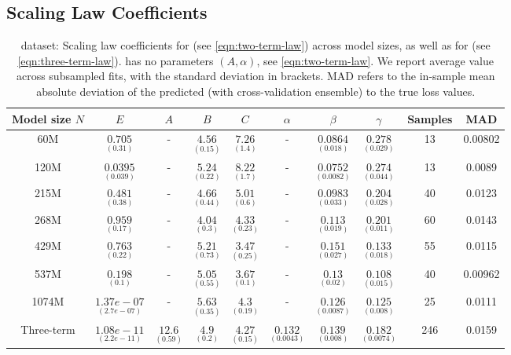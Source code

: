  


\subsection{Scaling Law Coefficients}\label{sec:app:coefficients}

\begin{table}[H]
\centering
\caption{\li{} dataset: Scaling law coefficients for \ttl{} (see \eqref{eqn:two-term-law}) across model sizes, as well as for \tttl{} (see \eqref{eqn:three-term-law}). \ttl{} has no parameters $(A, \alpha)$, see \eqref{eqn:two-term-law}. We report average value across subsampled fits, with the standard deviation in brackets. MAD refers to the in-sample mean absolute deviation of the predicted (with cross-validation ensemble) to the true loss values.}
\label{tab:bs-step-laws-li}
\begin{tabular}{|c|cccc|ccc||cc|}
\hline
Model size $N$ & $E$ & $A$ & $B$ & $C$ & $\alpha$ & $\beta$ & $\gamma$ & Samples & MAD \\
\hline \hline
60M & $\underset{(0.31)}{0.705}$ & - & $\underset{(0.15)}{4.56}$ & $\underset{(1.4)}{7.26}$ & - & $\underset{(0.018)}{0.0864}$ & $\underset{(0.029)}{0.278}$ & 13 & 0.00802 \\[10pt]
120M & $\underset{(0.039)}{0.0395}$ & - & $\underset{(0.22)}{5.24}$ & $\underset{(1.7)}{8.22}$ & - & $\underset{(0.0082)}{0.0752}$ & $\underset{(0.044)}{0.274}$ & 13 & 0.0089 \\[10pt]
215M & $\underset{(0.38)}{0.481}$ & - & $\underset{(0.44)}{4.66}$ & $\underset{(0.6)}{5.01}$ & - & $\underset{(0.033)}{0.0983}$ & $\underset{(0.028)}{0.204}$ & 40 & 0.0123 \\[10pt]
268M & $\underset{(0.17)}{0.959}$ & - & $\underset{(0.3)}{4.04}$ & $\underset{(0.23)}{4.33}$ & - & $\underset{(0.019)}{0.113}$ & $\underset{(0.011)}{0.201}$ & 60 & 0.0143 \\[10pt]
429M & $\underset{(0.22)}{0.763}$ & - & $\underset{(0.73)}{5.21}$ & $\underset{(0.25)}{3.47}$ & - & $\underset{(0.027)}{0.151}$ & $\underset{(0.018)}{0.133}$ & 55 & 0.0115 \\[10pt]
537M & $\underset{(0.1)}{0.198}$ & - & $\underset{(0.55)}{5.05}$ & $\underset{(0.1)}{3.67}$ & - & $\underset{(0.02)}{0.13}$ & $\underset{(0.015)}{0.108}$ & 40 & 0.00962 \\[10pt]
1074M & $\underset{(2.7e-07)}{1.37e-07}$ & - & $\underset{(0.35)}{5.63}$ & $\underset{(0.19)}{4.3}$ & - & $\underset{(0.0087)}{0.126}$ & $\underset{(0.008)}{0.125}$ & 25 & 0.0111 \\[10pt]
\hline \hline
Three-term & $\underset{(2.2e-11)}{1.08e-11}$ & $\underset{(0.59)}{12.6}$ & $\underset{(0.2)}{4.9}$ & $\underset{(0.15)}{4.27}$ & $\underset{(0.0043)}{0.132}$ & $\underset{(0.008)}{0.139}$ & $\underset{(0.0074)}{0.182}$ & 246 & 0.0159 \\[10pt]
\hline
\end{tabular}
\end{table}
